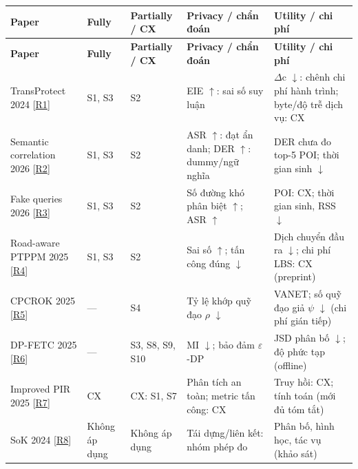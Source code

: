 \begingroup\small
\begin{longtable}{@{}P{3.044cm}P{1.474cm}P{2.093cm}P{4.138cm}P{5.327cm}@{}}
\toprule
\textbf{Paper} & \textbf{Fully} & \textbf{Partially / CX} & \textbf{Privacy / chẩn đoán} & \textbf{Utility / chi phí}\\\midrule
\endfirsthead
\toprule
\textbf{Paper} & \textbf{Fully} & \textbf{Partially / CX} & \textbf{Privacy / chẩn đoán} & \textbf{Utility / chi phí}\\\midrule
\endhead
\bottomrule\endfoot
TransProtect 2024 [\href{https://arxiv.org/html/2409.09495v1}{R1}] & S1, S3 & S2 & EIE $\uparrow$: sai số suy luận & $\Delta$c $\downarrow$: chênh chi phí hành trình; byte/độ trễ dịch vụ: CX\\
\addlinespace[3pt]
Semantic correlation 2026 [\href{https://link.springer.com/article/10.1007/s44443-026-00899-w}{R2}] & S1, S3 & S2 & ASR $\uparrow$: đạt ẩn danh; DER $\uparrow$: dummy/ngữ nghĩa & DER chưa đo top-5 POI; thời gian sinh $\downarrow$\\
\addlinespace[3pt]
Fake queries 2026 [\href{https://link.springer.com/article/10.1007/s44443-025-00438-z}{R3}] & S1, S3 & S2 & Số đường khó phân biệt $\uparrow$; ASR $\uparrow$ & POI: CX; thời gian sinh, RSS $\downarrow$\\
\addlinespace[3pt]
Road-aware PTPPM 2025 [\href{https://arxiv.org/html/2511.21020v1}{R4}] & S1, S3 & S2 & Sai số $\uparrow$; tấn công đúng $\downarrow$ & Dịch chuyển đầu ra $\downarrow$; chi phí LBS: CX (preprint)\\
\addlinespace[3pt]
CPCROK 2025 [\href{https://uhra.herts.ac.uk/id/eprint/25705/1/futureinternet-17-00165.pdf}{R5}] & — & S4 & Tỷ lệ khớp quỹ đạo $\rho$ $\downarrow$ & VANET; số quỹ đạo giả $\psi$ $\downarrow$ (chi phí gián tiếp)\\
\addlinespace[3pt]
DP-FETC 2025 [\href{https://www.aimspress.com/aimspress-data/era/2025/11/PDF/era-33-11-293.pdf}{R6}] & — & S3, S8, S9, S10 & MI $\downarrow$; bảo đảm $\varepsilon$-DP & JSD phân bố $\downarrow$; độ phức tạp (offline)\\
\addlinespace[3pt]
Improved PIR 2025 [\href{https://onlinelibrary.wiley.com/doi/abs/10.1002/cpe.70447}{R7}] & CX & CX: S1, S7 & Phân tích an toàn; metric tấn công: CX & Truy hồi: CX; tính toán (mới đủ tóm tắt)\\
\addlinespace[3pt]
SoK 2024 [\href{https://petsymposium.org/popets/2024/popets-2024-0068.pdf}{R8}] & Không áp dụng & Không áp dụng & Tái dựng/liên kết: nhóm phép đo & Phân bố, hình học, tác vụ (khảo sát)\\

\end{longtable}
